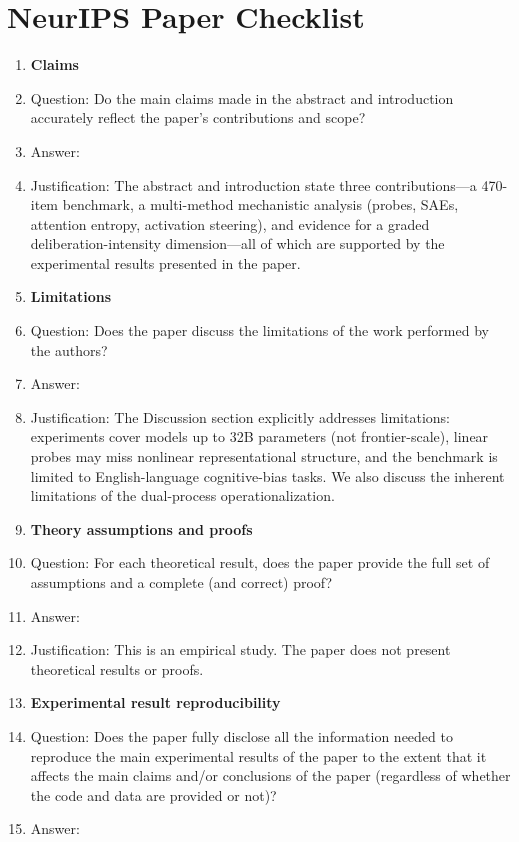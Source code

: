 \section*{NeurIPS Paper Checklist}

\begin{enumerate}

\item {\bf Claims}
    \item[] Question: Do the main claims made in the abstract and introduction accurately reflect the paper's contributions and scope?
    \item[] Answer: \answerYes{}
    \item[] Justification: The abstract and introduction state three contributions—a 470-item benchmark, a multi-method mechanistic analysis (probes, SAEs, attention entropy, activation steering), and evidence for a graded deliberation-intensity dimension—all of which are supported by the experimental results presented in the paper.
\item {\bf Limitations}
    \item[] Question: Does the paper discuss the limitations of the work performed by the authors?
    \item[] Answer: \answerYes{}
    \item[] Justification: The Discussion section explicitly addresses limitations: experiments cover models up to 32B parameters (not frontier-scale), linear probes may miss nonlinear representational structure, and the benchmark is limited to English-language cognitive-bias tasks. We also discuss the inherent limitations of the dual-process operationalization.
\item {\bf Theory assumptions and proofs}
    \item[] Question: For each theoretical result, does the paper provide the full set of assumptions and a complete (and correct) proof?
    \item[] Answer: \answerNA{}
    \item[] Justification: This is an empirical study. The paper does not present theoretical results or proofs.
    \item {\bf Experimental result reproducibility}
    \item[] Question: Does the paper fully disclose all the information needed to reproduce the main experimental results of the paper to the extent that it affects the main claims and/or conclusions of the paper (regardless of whether the code and data are provided or not)?
    \item[] Answer: \answerYes{}

\end{enumerate}
